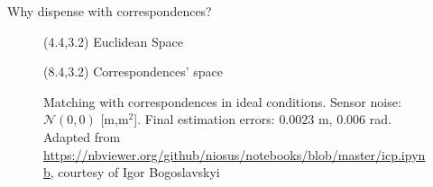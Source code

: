 \begin{frame}[noframenumbering]{Why dispense with correspondences?}


  \begin{figure}\vspace{1cm}
    \caption{Matching with correspondences in ideal conditions. Sensor noise:
             $\mathcal{N}(0,0)$ [m,m$^2$]. Final estimation errors: $0.0023$ m, $0.006$
             rad. Adapted from
             \url{https://nbviewer.org/github/niosus/notebooks/blob/master/icp.ipynb},
             courtesy of Igor Bogoslavskyi}
    \begin{textblock}{3}(4.4,3.2)
      \scriptsize Euclidean Space
    \end{textblock}
    \begin{textblock}{4}(8.4,3.2)
      \scriptsize Correspondences' space
    \end{textblock}
  \end{figure}

\end{frame}
